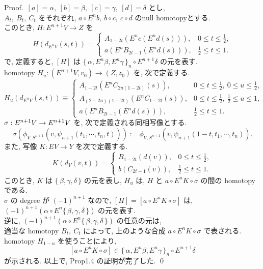 \documentclass[12pt, leqno]{ltjsarticle}
\newcommand{\Ex}{E}        %
\newcommand{\toda}[1]{\{\,#1\,\}}              %
\newcommand{\todai}[2][]{\{\,#2\,\}_{#1}}      %
\numberwithin{equation}{section}
\theoremstyle{plain}
\theoremstyle{definition}
\theoremstyle{remark}
\begin{document}
Proof.\
\([a]=\alpha,\ [b]=\beta,\ [c]=\gamma,\ [d]=\delta\)
とし,\\
\(A_{t},\ B_{t},\ C_{t}\)
をそれぞれ,
\( a\circ\Ex^{n}b,\ b\circ c,\ c\circ d\)
のnull homotopyとする.\\
このとき, 
\(H:E^{n+1}V\to Z\) を 
\[
H(d_{E^n V}(s, t)) = \left\{
\begin{array}{ll}
  A_{1-2t}(E^n c(E^n d(s))),
  & 0\leq t \leq \frac{1}{2},\\
  a(E^n B_{2t-1}(E^n d(s))), 
  & \frac{1}{2} \leq t \leq 1.  
\end{array}
\right.
\]
で, 定義すると,
\([H]\) は 
\(\todai[n]{\alpha, E^n\beta, E^n\gamma}\circ E^{n+1}\delta\)
の元を表す.\\
homotopy
\(H_{u}:(\Ex^{n+1}V,v_0) \longrightarrow (Z,z_0)\)
を, 次で定義する.
\[
H_{u}(d_{\Ex^{n}V}(s,t))\equiv\left\{
\begin{array}{ll}
A_{1-2t}(\Ex^{n}C_{2u(1-2t)}(s)), &
0\leq t \leq \frac{1}{2},\ 0\leq u \leq \frac{1}{2}, \\
A_{(2-2u)(1-2t)}(\Ex^{n}C_{1-2t}(s)), &
0\leq t \leq \frac{1}{2},\ \frac{1}{2} \leq u \leq 1, \\
a(\Ex^{n}B_{2t-1}(\Ex^{n}d(s))), &
\frac{1}{2} \leq t \leq 1.
\end{array}\right.
\]
\(\sigma:\Ex^{n+1}V\to\Ex^{n+1}V \notag\)
を, 次で定義される同相写像とする.
\[
\sigma(\phi_{V,S^{n+1}}(v,\psi_{n+1}(t_{1},\cdots,t_{n},t))) :=
\phi_{V,S^{n+1}}(v,\psi_{n+1}(1-t,t_{1},\cdots,t_{n})).
\]
また, 写像 \(K:EV\to Y\) を次で定義する.
\[
K(d_{V}(v, t)) = \left\{
\begin{array}{ll}
  B_{1-2t}(d(v)),
  & 0\leq t \leq \frac{1}{2},\\
  b(C_{2t-1}(v)), 
  & \frac{1}{2} \leq t \leq 1.  
\end{array}
\right.
\]
このとき,
\(K\) は \(\toda{\beta, \gamma, \delta}\) の元を表し,
\(H_u\)
は, \(H\) と \(a\circ E^n K \circ \sigma\) 
の間の homotopy である.\\
\(\sigma\) の degree が \((-1)^{n+1}\) なので,
\([H] = [a\circ E^n K\circ \sigma]\)
は,
\((-1)^{n+1}(\alpha\circ E^n\toda{\beta, \gamma, \delta})\)
の元を表す.\\
逆に, 
\((-1)^{n+1}(\alpha\circ E^n\toda{\beta, \gamma, \delta})\)
の任意の元は,\\
適当な homotopy \(B_t,\ C_t\) によって,
上のような合成 \(a\circ E^n K\circ \sigma\)
で表される.\\
homotopy \(H_{1-u}\) を使うことにより,
\[
[a\circ E^n K\circ\sigma]
\in \todai[n]{\alpha, E^n\beta, E^n\gamma}\circ E^{n+1}\delta
\]
が示される.
以上で, Prop1.4 の証明が完了した.
\qed
\end{document}
